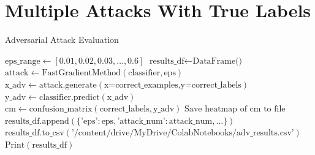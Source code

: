 \documentclass[11pt,onside]{article}
\begin{document}
\section{Multiple Attacks With True Labels}
\begin{algorithm}[H]
\caption{Adversarial Attack Evaluation}
\begin{algorithmic}[1]
\State $\text{eps\_range} \gets [0.01, 0.02, 0.03, \ldots, 0.6]$
\State $\text{results\_df} \gets \text{DataFrame()}$
        \State $\text{attack} \gets \text{FastGradientMethod}(\text{classifier}, \text{eps})$
        \State $\text{x\_adv} \gets \text{attack.generate}(\text{x=correct\_examples,y=correct\_labels})$
        \State $\text{y\_adv} \gets \text{classifier.predict}(\text{x\_adv})$
        \State $\text{cm} \gets \text{confusion\_matrix}(\text{correct\_labels}, \text{y\_adv})$
        \State $\text{Save heatmap of cm to file}$
        \State $\text{results\_df.append}(\{\text{'eps'}: \text{eps}, \text{'attack\_num'}: \text{attack\_num}, \ldots\})$
    \EndFor
\EndFor
\State $\text{results\_df.to\_csv}(\text{'/content/drive/MyDrive/ColabNotebooks/adv\_results.csv'})$
\State $\text{Print}(\text{results\_df})$
\end{algorithmic}
\end{algorithm}
\end{document}

